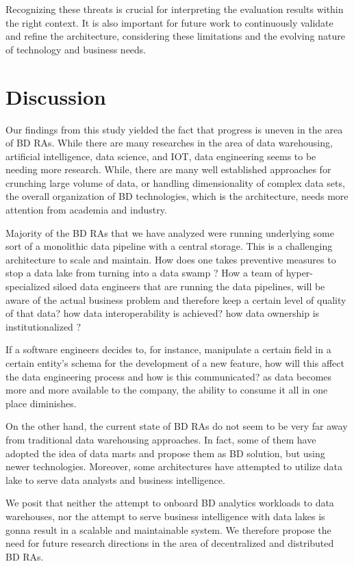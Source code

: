 \documentclass[review]{elsarticle}
\begin{document}
Recognizing these threats is crucial for interpreting the evaluation results within the right context. It is also important for future work to continuously validate and refine the architecture, considering these limitations and the evolving nature of technology and business needs.


\section{Discussion} \label{discussion-section}

Our findings from this study yielded the fact that progress is uneven in the area of BD RAs. While there are many researches in the area of data warehousing, artificial intelligence, data science, and IOT, data engineering seems to be needing more research. While, there are many well established approaches for crunching large volume of data, or handling dimensionality of complex data sets, the overall organization of BD technologies, which is the architecture, needs more attention from academia and industry. 

Majority of the BD RAs that we have analyzed were running underlying some sort of a monolithic data pipeline with a central storage. This is a challenging architecture to scale and maintain. How does one takes preventive measures to stop a data lake from turning into a data swamp ? How a team of hyper-specialized siloed data engineers that are running the data pipelines, will be aware of the actual business problem and therefore keep a certain level of quality of that data? how data interoperability is achieved? how data ownership is institutionalized ?

If a software engineers decides to, for instance, manipulate a certain field in a certain entity's schema for the development of a new feature, how will this affect the data engineering process and how is this communicated? as data becomes more and more available to the company, the ability to consume it all in one place diminishes. 

On the other hand, the current state of BD RAs do not seem to be very far away from traditional data warehousing approaches. In fact, some of them have adopted the idea of data marts and propose them as BD solution, but using newer technologies. Moreover, some architectures have attempted to utilize data lake to serve data analysts and business intelligence. 

We posit that neither the attempt to onboard BD analytics workloads to data warehouses, nor the attempt to serve business intelligence with data lakes is gonna result in a scalable and maintainable system. We therefore propose the need for future research directions in the area of decentralized and distributed BD RAs.     
\end{document}
